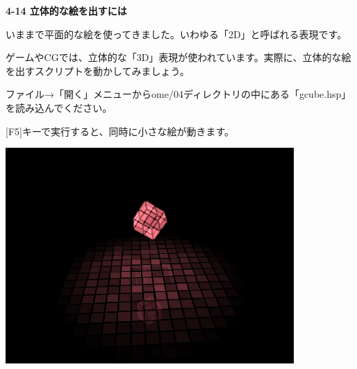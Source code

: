 \documentclass[a4paper,dvipdfmx]{jarticle}
\newcommand\textstyleqwerty[1]{#1}
\begin{document}
\bigskip


\bigskip

\textstyleqwerty{\textbf{4-14 立体的な絵を出すには}}


\bigskip

いままで平面的な絵を使ってきました。いわゆる「2D」と呼ばれる表現です。

ゲームやCGでは、立体的な「3D」表現が使われています。実際に、立体的な絵を出すスクリプトを動かしてみましょう。


\bigskip

ファイル→「開く」メニューからome/04ディレクトリの中にある「gcube.hsp」を読み込んでください。

[F5]キーで実行すると、同時に小さな絵が動きます。


\bigskip



\begin{center}
\includegraphics[width=10.971cm,height=8.229cm]{text04-img/text04-img034.png}

\end{center}

\bigskip


\bigskip


\bigskip


\bigskip


\bigskip


\bigskip


\bigskip


\bigskip


\bigskip


\bigskip


\bigskip


\bigskip


\bigskip
\end{document}
